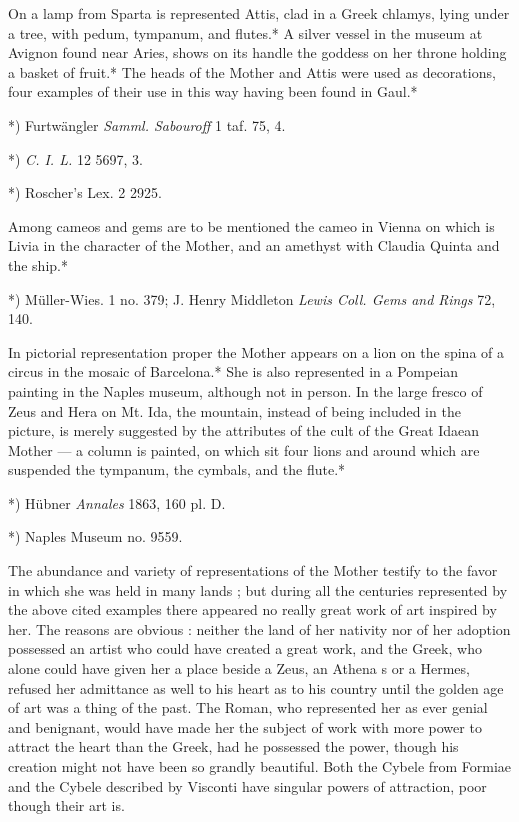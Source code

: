 \documentclass[a4paper, 11pt, oneside, polutonikogreek, english]{article}
\begin{document}
On a lamp from Sparta is represented Attis, clad in a Greek chlamys, lying under a tree, with pedum, tympanum, and flutes.* A silver vessel in the museum at Avignon found near Aries, shows on its handle the goddess on her throne holding a basket of fruit.* The heads of the Mother and Attis were used as decorations, four examples of their use in this way having been found in Gaul.*

*) Furtwängler \emph{Samml. Sabouroff} 1 taf. 75, 4.

*) \emph{C. I. L.} 12 5697, 3.

*) Roscher's Lex. 2 2925.

Among cameos and gems are to be mentioned the cameo in Vienna on which is Livia in the character of the Mother, and an amethyst with Claudia Quinta and the ship.*

*) Müller-Wies. 1 no. 379; J. Henry Middleton \emph{Lewis Coll. Gems and Rings} 72, 140.

In pictorial representation proper the Mother appears on a lion on the spina of a circus in the mosaic of Barcelona.* She is also represented in a Pompeian painting in the Naples museum, although not in person. In the large fresco of Zeus and Hera on Mt. Ida, the mountain, instead of being included in the picture, is merely suggested by the attributes of the cult of the Great Idaean Mother --- a column is painted, on which sit four lions and around which are suspended the tympanum, the cymbals, and the flute.*

*) Hübner \emph{Annales} 1863, 160 pl. D.

*) Naples Museum no. 9559.

The abundance and variety of representations of the Mother testify to the favor in which she was held in many lands ; but during all the centuries represented by the above cited examples there appeared no really great work of art inspired by her. The reasons are obvious : neither the land of her nativity nor of her adoption possessed an artist who could have created a great work, and the Greek, who alone could have given her a place beside a Zeus, an Athena s or a Hermes, refused her admittance as well to his heart as to his country until the golden age of art was a thing of the past. The Roman, who represented her as ever genial and benignant, would have made her the subject of work with more power to attract the heart than the Greek, had he possessed the power, though his creation might not have been so grandly beautiful. Both the Cybele from Formiae and the Cybele described by Visconti have singular powers of attraction, poor though their art is.
\end{document}
